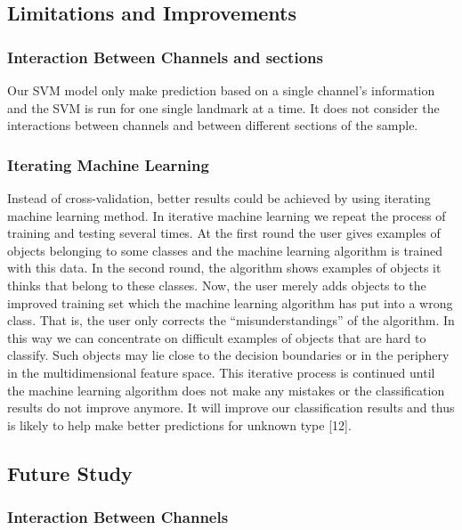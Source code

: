 \documentclass[10pt,letterpaper]{article}
\begin{document}
\subsection{Limitations and
Improvements}\label{limitations-and-improvements}

\subsubsection{Interaction Between Channels and
sections}\label{interaction-between-channels-and-sections}

Our SVM model only make prediction based on a single channel's
information and the SVM is run for one single landmark at a time. It
does not consider the interactions between channels and between
different sections of the sample.

\subsubsection{Iterating Machine
Learning}\label{iterating-machine-learning}

Instead of cross-validation, better results could be achieved by using
iterating machine learning method. In iterative machine learning we
repeat the process of training and testing several times. At the first
round the user gives examples of objects belonging to some classes and
the machine learning algorithm is trained with this data. In the second
round, the algorithm shows examples of objects it thinks that belong to
these classes. Now, the user merely adds objects to the improved
training set which the machine learning algorithm has put into a wrong
class. That is, the user only corrects the ``misunderstandings'' of the
algorithm. In this way we can concentrate on difficult examples of
objects that are hard to classify. Such objects may lie close to the
decision boundaries or in the periphery in the multidimensional feature
space. This iterative process is continued until the machine learning
algorithm does not make any mistakes or the classification results do
not improve anymore. It will improve our classification results and thus
is likely to help make better predictions for unknown type {[}12{]}.

\subsection{Future Study}\label{future-study}

\subsubsection{Interaction Between
Channels}\label{interaction-between-channels}
\end{document}

